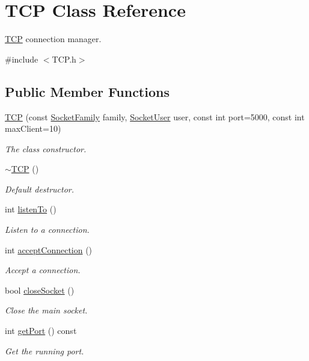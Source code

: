 \hypertarget{class_t_c_p}{}\section{T\+CP Class Reference}
\label{class_t_c_p}


\hyperlink{class_t_c_p}{T\+CP} connection manager.  




{\ttfamily \#include $<$T\+C\+P.\+h$>$}

\subsection*{Public Member Functions}
\begin{DoxyCompactItemize}
\item 
\hyperlink{class_t_c_p_a2e34b5e95ac3a10dfae54c3a90580c25}{T\+CP} (const \hyperlink{_t_c_p_8h_ade4363acb0f359029daf637cea73cf55}{Socket\+Family} family, \hyperlink{_t_c_p_8h_a95f589056c7a3d16ced261e576f9055d}{Socket\+User} user, const int port=5000, const int max\+Client=10)
\begin{DoxyCompactList}\small\item\em The class constructor. \end{DoxyCompactList}\item 
\hyperlink{class_t_c_p_aa60dfec4c3dfdc84a0a64322eed4ee5c}{$\sim$\+T\+CP} ()\hypertarget{class_t_c_p_aa60dfec4c3dfdc84a0a64322eed4ee5c}{}\label{class_t_c_p_aa60dfec4c3dfdc84a0a64322eed4ee5c}

\begin{DoxyCompactList}\small\item\em Default destructor. \end{DoxyCompactList}\item 
int \hyperlink{class_t_c_p_a08da32477d29d88d0e60c3d1ee256874}{listen\+To} ()
\begin{DoxyCompactList}\small\item\em Listen to a connection. \end{DoxyCompactList}\item 
int \hyperlink{class_t_c_p_aeedb6f060ba87089bcbc9f241879e8ce}{accept\+Connection} ()
\begin{DoxyCompactList}\small\item\em Accept a connection. \end{DoxyCompactList}\item 
bool \hyperlink{class_t_c_p_a85071a2397175ffce4019ac421a37702}{close\+Socket} ()
\begin{DoxyCompactList}\small\item\em Close the main socket. \end{DoxyCompactList}\item 
int \hyperlink{class_t_c_p_aaafe7ddd1a319c3f7f3b48e1f88fc13b}{get\+Port} () const 
\begin{DoxyCompactList}\small\item\em Get the running port. \end{DoxyCompactList}\end{DoxyCompactItemize}
